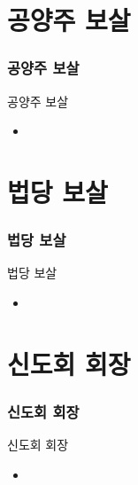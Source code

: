 \documentclass[aspectratio=1610,10pt,xcolor=pdftex,dvipsnames,table,handout]{beamer}
\begin{document}
		\section{공양주 보살}
		\begin{frame} [t,plain]
		\frametitle{공양주 보살}
			\begin{block} {공양주 보살}
			\setlength{\leftmargini}{6em}			
			\begin{itemize}
				\item [공양주 보살] 
			\end{itemize}
			\end{block}						
								
		\end{frame}						

		\section{법당 보살}
		\begin{frame} [t,plain]
		\frametitle{법당 보살}
			\begin{block} {법당 보살}
			\setlength{\leftmargini}{6em}			
			\begin{itemize}
				\item [법당 보살] 
			\end{itemize}
			\end{block}						
								
		\end{frame}						



		\section{신도회 회장}
		\begin{frame} [t,plain]
		\frametitle{신도회 회장}
			\begin{block} {신도회 회장}
			\setlength{\leftmargini}{6em}			
			\begin{itemize}
				\item [신도회 회장] 
			\end{itemize}
			\end{block}						
								
		\end{frame}						
\end{document}
